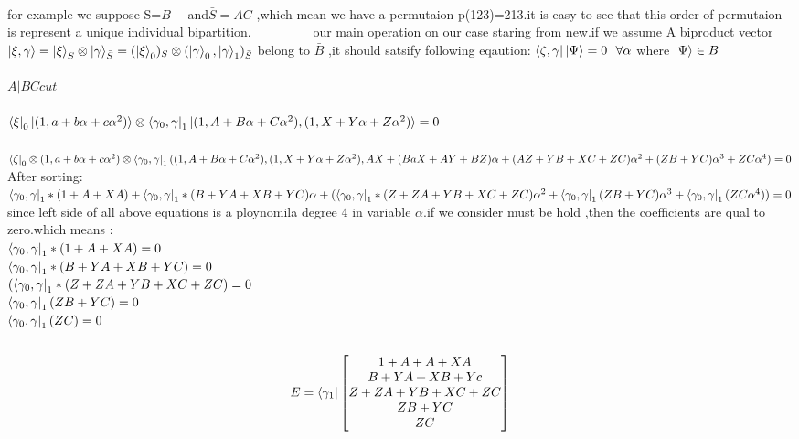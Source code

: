 \documentclass[12pt,twoside]{report}
\begin{document}
 \\
 for example we suppose S=$B  $ \ \ and$  \bar{S}=AC $ ,which mean we have a permutaion p(123)=213.it is easy to see that this order of permutaion is represent a unique individual bipartition. 
 \ \ \ \ \ \ \ \ \ our main operation on our case  staring from new.if we assume A biproduct vector  $ \ket{\xi,\gamma}= \ket{\xi}_{S}\otimes\ket{\gamma}_{\bar{S}}=(\ket{\xi}_{0})_{S}\otimes(\Ket{\gamma}_{0},\ket{\gamma}_{1})_{\bar{S}}$ belong to    $ \bar{B} $ ,it should satsify following eqaution:
 $ \bra{\zeta,\gamma}\ket{\Psi}=0 \ \  \forall \alpha $ where $ \ket{\Psi}\in B $\\
 \\
 $ A|BC cut $\\
 \\
 $ \bra{\xi}_{0}\ket{(1,a+b\alpha+c\alpha^{2})}\otimes\bra{\gamma_{0},\gamma}_{1}\ket{(1,A+B\alpha+C\alpha^{2}),(1,X+Y\alpha+Z\alpha^{2})}=0 $\\
 \\
 $ \bra{\zeta}_{0}\otimes(1,a+b\alpha+c\alpha^{2})\otimes\bra{\gamma_{0},\gamma}_{1}((1,A+B\alpha+C\alpha^{2}),(1,X+Y\alpha+Z\alpha^{2}),AX+(BaX+AY+BZ)\alpha+(AZ+YB+XC+ZC)\alpha^{2}+(ZB+YC)\alpha^{3}+ZC\alpha^{4})=0 $\\
 After sorting:\\
 $ \bra{\gamma_{0},\gamma}_{1}*(1+A+XA)+\bra{\gamma_{0},\gamma}_{1}*(B+YA+XB+YC)\alpha+(\bra{\gamma_{0},\gamma}_{1}*(Z+ZA+YB+XC+ZC)\alpha^{2}+\bra{\gamma_{0},\gamma}_{1}(ZB+YC)\alpha^{3}+\bra{\gamma_{0},\gamma}_{1}(ZC\alpha^{4}))=0$
 \\
 since left side of all above equations is a ploynomila degree 4 in variable $\alpha$.if we consider must be hold ,then the coefficients are qual to zero.which means :
 \\
 $ \bra{\gamma_{0},\gamma}_{1}*(1+A+XA) =0$\\
 $\bra{\gamma_{0},\gamma}_{1}*(B+YA+XB+YC)=0  $\\
 $ (\bra{\gamma_{0},\gamma}_{1}*(Z+ZA+YB+XC+ZC)=0 $\\
 $ \bra{\gamma_{0},\gamma}_{1}(ZB+YC)=0 $\\
 $ \bra{\gamma_{0},\gamma}_{1}(ZC)=0 $
 \\
 \\
 \begin{equation}
 E=\bra{\gamma_{1}}
 \begin{bmatrix}
 1+A+A+XA\\
 B+YA+XB+Yc\\
 Z+ZA+YB+XC+ZC\\
 ZB+YC\\
 ZC
 \end{bmatrix}
 \end{equation}
\end{document}
